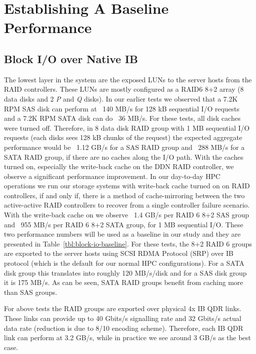 \section{Establishing A Baseline Performance}
\label{sec:baseline}

\subsection{Block I/O over Native IB} 

The lowest layer in the system are the exposed LUNs to the server hosts from
the RAID controllers.  These LUNs are mostly configured as a RAID6 8+2 array (8
data disks and 2 \textit{P} and \textit{Q} disks). In our earlier tests we
observed that a 7.2K RPM SAS disk can perform at ~140 MB/s for 128 kB
sequential I/O requests and a 7.2K RPM SATA disk can do ~36 MB/s. For these
tests, all disk caches were turned off. Therefore, in 8 data disk RAID group
with 1 MB sequential I/O requests (each disks sees 128 kB chunks of the
request) the expected aggregate performance would be ~1.12 GB/s for a SAS RAID
group and ~288 MB/s for a SATA RAID group, if there are no caches along the I/O
path.  With the caches turned on, especially the write-back cache on the DDN
RAID controller, we observe a significant performance improvement. In our
day-to-day HPC operations we run our storage systems with write-back cache
turned on on RAID controllers, if and only if, there is a method of
cache-mirroring between the two active-active RAID controllers to recover from
a single controller failure scenario. With the write-back cache on we observe
~1.4 GB/s per RAID 6 8+2 SAS group and ~955 MB/s per RAID 6 8+2 SATA group, for
1 MB sequential I/O. These two performance numbers will be used as a baseline
in our study and they are presented in Table~\ref{tbl:block-io-baseline}.  For
these tests, the 8+2 RAID 6 groups are exported to the server hosts using SCSI
RDMA Protocol (SRP) over IB protocol (which is the default for our normal HPC
configurations). For a SATA disk group this translates into roughly 120
MB/s/disk and for a SAS disk group it is 175 MB/s. As can be seen, SATA RAID
groups benefit from caching more than SAS groups. 

For above tests the RAID groups are exported over physical 4x IB QDR links.
These links can provide up to 40 Gbits/s signalling rate and 32 Gbits/s actual
data rate (reduction is due to 8/10 encoding scheme). Therefore, each IB QDR
link can perform at 3.2 GB/s, while in practice we see around 3 GB/s as the
best case. 

